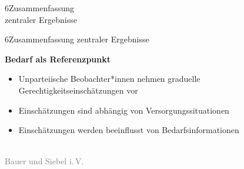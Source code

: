 \documentclass[xcolor=table,9pt,aspectratio=169]{beamer}
\begin{document}
\begin{frame}
\begin{overlayarea}{\textwidth}{0.81\paperheight}{
   \vspace*{11mm}
   \textcolor{uolblue}
   {6\hspace*{1em}Zusammenfassung\\\hspace*{1.5em}zentraler Ergebnisse}
}
\end{overlayarea}
\end{frame}


\begin{frame}{\vspace*{10mm}6\hspace*{1em}Zusammenfassung zentraler Ergebnisse}
\begin{multicols}{2}
   \textbf{Bedarf als Referenzpunkt}
   \medskip
   \begin{itemize}
   \item[(1)] Unparteiische Beobachter*innen nehmen graduelle Gerechtigkeitseinschätzungen vor
   \item[(2)] Einschätzungen sind abhängig von Versorgungssituationen
   \item[(3)] Einschätzungen werden beeinflusst von Bedarfsinformationen
\end{itemize}
   \vfill
   \begin{center}
      \\
      \textcolor{gray}{Bauer und Siebel i.\,V.}
   \end{center}
\end{multicols}
\end{frame}
\end{document}
